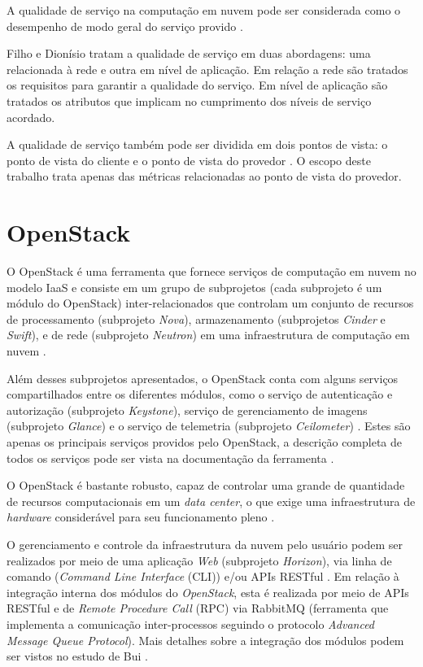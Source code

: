 \documentclass[conference]{IEEEtran}
\begin{document}
A qualidade de serviço na computação em nuvem pode ser considerada como o
desempenho de modo geral do serviço provido \cite{openstack}.

Filho e Dionísio \cite{leite2016influencia} tratam a qualidade de serviço em duas abordagens:
uma relacionada à rede e outra em nível de aplicação. Em relação a rede são tratados
os requisitos para garantir a qualidade do serviço. Em nível de aplicação são tratados
os atributos que implicam no cumprimento dos níveis de serviço acordado. 

A qualidade de serviço também pode ser dividida em dois pontos de vista: o 
ponto de vista do cliente e o ponto de vista do provedor \cite{openstack, bhardwaj2010cloud}. 
O escopo deste trabalho trata apenas das métricas relacionadas ao ponto de vista do provedor.


\section{OpenStack}

O OpenStack é uma ferramenta que fornece serviços de computação em nuvem no modelo IaaS e consiste em um grupo de subprojetos (cada subprojeto é um módulo 
do OpenStack) inter-relacionados 
que controlam um conjunto de recursos de processamento (subprojeto \textit{Nova}), armazenamento (subprojetos \textit{Cinder} e \textit{Swift}),
e de rede (subprojeto \textit{Neutron}) em uma infraestrutura de computação em nuvem \cite{openstack} \cite{bui2016}.

Além desses subprojetos apresentados, o OpenStack conta com alguns serviços compartilhados entre os diferentes módulos, como o serviço de 
autenticação e autorização (subprojeto \textit{Keystone}), serviço de gerenciamento de imagens (subprojeto \textit{Glance}) e o serviço de 
telemetria (subprojeto \textit{Ceilometer}) \cite{openstack}. Estes são apenas os principais serviços providos pelo OpenStack, a
descrição completa de todos os serviços pode ser vista na documentação da ferramenta \cite{openstack}.

O OpenStack é bastante robusto, capaz de controlar uma grande de quantidade
de recursos computacionais em um \textit{data center}, o que exige uma infraestrutura de \textit{hardware} 
considerável para seu funcionamento pleno \cite{openstack_general} \cite{openstack}.

O gerenciamento e controle da infraestrutura da nuvem pelo usuário podem ser realizados por meio de uma aplicação \textit{Web}
(subprojeto \textit{Horizon}), via linha de comando (\textit{Command Line Interface} (CLI)) e/ou APIs RESTful \cite{bui2016} \cite{openstack}.
Em relação à integração interna dos módulos do \textit{OpenStack}, esta é realizada por meio de APIs RESTful e 
de \textit{Remote Procedure Call} (RPC) via RabbitMQ (ferramenta que implementa a comunicação inter-processos seguindo o protocolo
\textit{Advanced Message Queue Protocol})\cite{bui2016}. Mais detalhes sobre a integração dos módulos podem ser vistos no estudo de Bui \cite{bui2016}.
\end{document}
